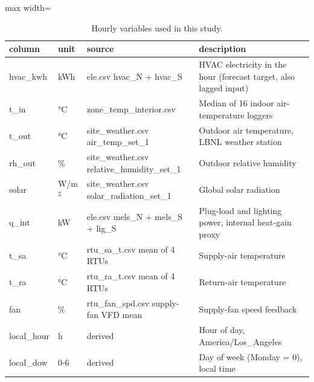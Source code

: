 \begin{table}[H]
\centering\small
\caption{Hourly variables used in this study.}\label{tab:dict}
\begin{adjustbox}{max width=\textwidth}
\begin{tabular}{llp{5.2cm}p{5.6cm}}
\toprule
column & unit & source & description \\
\midrule
hvac\_kwh & kWh & ele.csv hvac\_N + hvac\_S & HVAC electricity in the hour (forecast target, also lagged input) \\
t\_in & °C & zone\_temp\_interior.csv & Median of 16 indoor air-temperature loggers \\
t\_out & °C & site\_weather.csv air\_temp\_set\_1 & Outdoor air temperature, LBNL weather station \\
rh\_out & \% & site\_weather.csv relative\_humidity\_set\_1 & Outdoor relative humidity \\
solar & W/m$^2$ & site\_weather.csv solar\_radiation\_set\_1 & Global solar radiation \\
q\_int & kW & ele.csv mels\_N + mels\_S + lig\_S & Plug-load and lighting power, internal heat-gain proxy \\
t\_sa & °C & rtu\_sa\_t.csv mean of 4 RTUs & Supply-air temperature \\
t\_ra & °C & rtu\_ra\_t.csv mean of 4 RTUs & Return-air temperature \\
fan & \% & rtu\_fan\_spd.csv supply-fan VFD mean & Supply-fan speed feedback \\
local\_hour & h & derived & Hour of day, America/Los\_Angeles \\
local\_dow & 0-6 & derived & Day of week (Monday = 0), local time \\
\bottomrule
\end{tabular}
\end{adjustbox}
\end{table}
